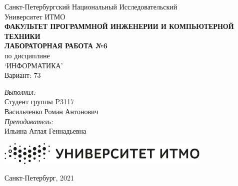 \documentclass[main.tex]{subfiles}
\begin{document}
\begin{center}
Санкт-Петербургский Национальный Исследовательский\\
Университет ИТМО\\
\hfill \break
\textbf{ФАКУЛЬТЕТ ПРОГРАММНОЙ ИНЖЕНЕРИИ И КОМПЬЮТЕРНОЙ ТЕХНИКИ}\\
\vspace{2.5cm}
\large{\textbf{ЛАБОРАТОРНАЯ РАБОТА №6}}\\
по дисциплине\\
\large{`ИНФОРМАТИКА'}\\
\hfill \break
Вариант: 73\\
\end{center}

\vspace{8cm}
 
\begin{flushright}
\textit{Выполнил:}\\
Студент группы P3117\\
Васильченко Роман Антонович\\
\textit{Преподаватель:}\\
Ильина Аглая Геннадьевна\\
\end{flushright}
 
\vfill

\begin{center}
\includegraphics[scale=0.5]{itmo}
\end{center}
\begin{center} Санкт-Петербург, 2021 \end{center}

\thispagestyle{empty}
\newpage
\end{document}
